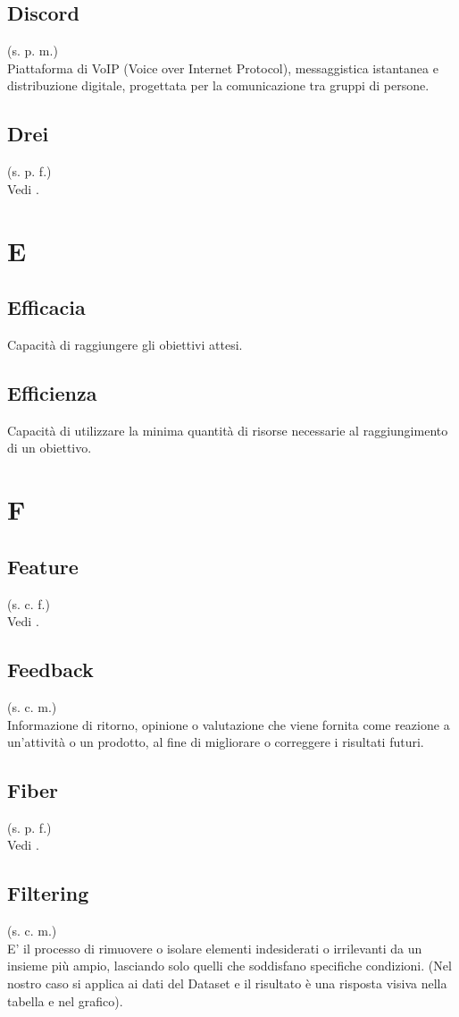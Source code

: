     \subsection{Discord}
    (s. p. m.)\\
    Piattaforma di VoIP (Voice over Internet Protocol), messaggistica istantanea 
    e distribuzione digitale, progettata per la comunicazione tra gruppi di persone.
    \subsection{Drei}
    (s. p. f.)\\
    Vedi .
\pagebreak
\section{E}
    \subsection{Efficacia}
    Capacità di raggiungere gli obiettivi attesi.
    \subsection{Efficienza}
    Capacità di utilizzare la minima quantità di risorse necessarie al raggiungimento
    di un obiettivo.
\pagebreak
\section{F}
    \subsection{Feature}
    (s. c. f.)\\
    Vedi .
    \subsection{Feedback}
    (s. c. m.)\\
    Informazione di ritorno, opinione o valutazione che viene fornita come reazione a 
    un'attività o un prodotto, al fine di migliorare o correggere i risultati futuri.
    \subsection{Fiber}
    (s. p. f.)\\
    Vedi .
    \subsection{Filtering}
    (s. c. m.)\\
    E' il processo di rimuovere o isolare elementi indesiderati o irrilevanti da un 
    insieme più ampio, lasciando solo quelli che soddisfano specifiche condizioni. (Nel nostro caso
    si applica ai dati del Dataset e il risultato è una risposta visiva nella tabella e nel grafico).
